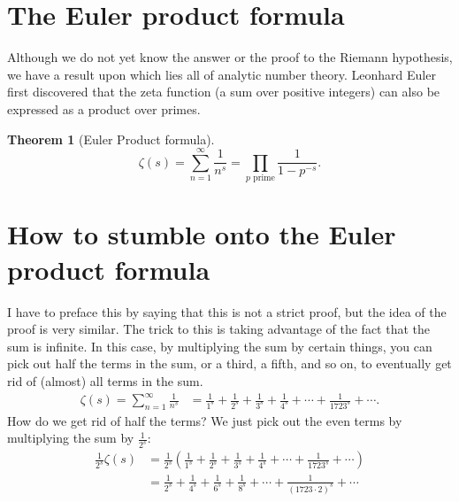 \documentclass[12pt,reqno]{amsart}
\theoremstyle{plain} %
\newtheorem{theorem}{Theorem}[section]
\theoremstyle{remark}
\theoremstyle{definition}
\begin{document}
\newpage
\thispagestyle{headings}
\section{The Euler product formula} \label{sect:1}

Although we do not yet know the answer or the proof to the Riemann hypothesis, we have a result upon which lies all of analytic number theory. Leonhard Euler first discovered that the zeta function (a sum over positive integers) can also be expressed as a product over primes.

\begin{theorem}[Euler Product formula] 
\label{thm:eulerprod}
\[
\zeta(s) = \sum_{n=1}^\infty \frac{1}{n^s}= \prod_{p \text{ prime}} \frac{1}{1-p^{-s}} .
\]
\end{theorem}

\section{How to stumble onto the Euler product formula} \label{sect:2}





I have to preface this by saying that this is not a strict proof, but the idea of the proof is very similar. 
The trick to this is taking advantage of the fact that the sum is infinite. In this case, by multiplying the sum by certain things, you can pick out half the terms in the sum, or a third, a fifth, and so on, to eventually get rid of (almost) all terms in the sum.
\begin{align*}
\zeta(s) = \sum_{n=1}^\infty \frac{1}{n^s} &= \frac{1}{1^s} + \frac{1}{2^s} + \frac{1}{3^s} + \frac{1}{4^s}+\cdots+\frac{1}{1723^s}+\cdots .
\end{align*}
How do we get rid of half the terms? We just pick out the even terms by multiplying the sum by $\frac{1}{2^s}$:
\begin{align*}
\frac{1}{2^s} \zeta(s)  &= \frac{1}{2^s} \left(\frac{1}{1^s } + \frac{1}{2^s} + \frac{1}{3^s} + \frac{1}{4^s}+\cdots+\frac{1}{1723^s}+\cdots \right) \\
&= \frac{1}{2^s} + \frac{1}{4^s} + \frac{1}{6^s}+\frac{1}{8^s}+ \cdots + \frac{1}{(1723\cdot 2)^s}+\cdots 
\end{align*}
\end{document}
